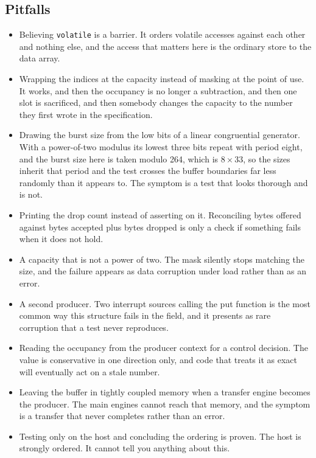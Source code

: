 \subsection*{Pitfalls}

\begin{itemize}
\item Believing \texttt{volatile} is a barrier. It orders volatile accesses
against each other and nothing else, and the access that matters here is the
ordinary store to the data array.
\item Wrapping the indices at the capacity instead of masking at the point of
use. It works, and then the occupancy is no longer a subtraction, and then one
slot is sacrificed, and then somebody changes the capacity to the number they
first wrote in the specification.
\item Drawing the burst size from the low bits of a linear congruential
generator. With a power-of-two modulus its lowest three bits repeat with period
eight, and the burst size here is taken modulo 264, which is \(8 \times 33\), so
the sizes inherit that period and the test crosses the buffer boundaries far
less randomly than it appears to. The symptom is a test that looks thorough and
is not.
\item Printing the drop count instead of asserting on it. Reconciling bytes
offered against bytes accepted plus bytes dropped is only a check if something
fails when it does not hold.
\item A capacity that is not a power of two. The mask silently stops matching
the size, and the failure appears as data corruption under load rather than as
an error.
\item A second producer. Two interrupt sources calling the put function is the
most common way this structure fails in the field, and it presents as rare
corruption that a test never reproduces.
\item Reading the occupancy from the producer context for a control decision.
The value is conservative in one direction only, and code that treats it as
exact will eventually act on a stale number.
\item Leaving the buffer in tightly coupled memory when a transfer engine
becomes the producer. The main engines cannot reach that memory, and the
symptom is a transfer that never completes rather than an error.
\item Testing only on the host and concluding the ordering is proven. The host
is strongly ordered. It cannot tell you anything about this.
\end{itemize}

